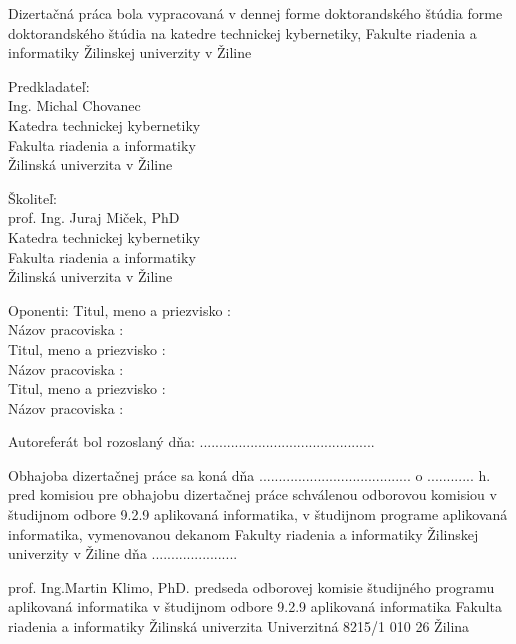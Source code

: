 \begin{titlepage}


Dizertačná práca bola vypracovaná v dennej forme doktorandského štúdia forme doktorandského štúdia
na katedre technickej kybernetiky, Fakulte riadenia a informatiky Žilinskej univerzity v Žiline


\vfill

Predkladateľ: \\
Ing. Michal Chovanec \\
Katedra technickej kybernetiky \\
Fakulta riadenia a informatiky \\
Žilinská univerzita v Žiline \\

\vfill

Školiteľ:	\\
prof. Ing. Juraj Miček, PhD \\
Katedra technickej kybernetiky \\
Fakulta riadenia a informatiky \\
Žilinská univerzita v Žiline \\

\vfill
\vfill
\vfill


Oponenti:
\vfill
Titul, meno a priezvisko  : \\
Názov pracoviska          : \\
\vfill
Titul, meno a priezvisko  : \\
Názov pracoviska          : \\
\vfill
Titul, meno a priezvisko  : \\
Názov pracoviska          : \\

\vfill
\vfill

Autoreferát bol rozoslaný dňa: .............................................

\vfill

Obhajoba dizertačnej práce sa koná dňa ....................................... o ............ h.
pred komisiou pre obhajobu dizertačnej práce schválenou odborovou komisiou v študijnom
odbore 9.2.9 aplikovaná informatika, v študijnom programe aplikovaná informatika,
vymenovanou dekanom Fakulty riadenia a informatiky Žilinskej univerzity v Žiline dňa ......................


\vfill


prof. Ing.Martin Klimo, PhD.
predseda odborovej komisie
študijného programu aplikovaná informatika
v študijnom odbore 9.2.9 aplikovaná informatika
Fakulta riadenia a informatiky
Žilinská univerzita
Univerzitná 8215/1
010 26 Žilina


\end{titlepage}



